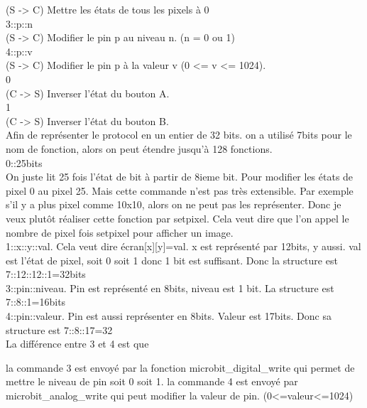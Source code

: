 \documentclass[14px]{article}
\begin{document}
(S -> C) Mettre les états de tous les pixels à 0
~\\

3::p::n
~\\

(S -> C) Modifier le pin p au niveau n. (n = 0 ou 1)
~\\

4::p::v
~\\

(S -> C) Modifier le pin p à la valeur v (0 <= v <= 1024).
~\\

0
~\\

(C -> S) Inverser l'état du bouton A.
~\\

1
~\\

(C -> S) Inverser l'état du bouton B.
~\\

Afin de représenter le protocol en un entier de 32 bits. on a utilisé 7bits pour le nom de fonction, alors on peut étendre jusqu'à 128 fonctions.
~\\

0::25bits
~\\

On juste lit 25 fois l'état de bit à partir de 8ieme bit. Pour modifier les états de pixel 0 au pixel 25. Mais cette commande n'est pas très extensible. Par exemple s'il y a plus pixel comme 10x10, alors on ne peut pas les représenter. Donc je veux plutôt réaliser cette fonction par setpixel. Cela veut dire que l'on appel le nombre de pixel fois setpixel pour afficher un image.
~\\

1::x::y::val. Cela veut dire écran[x][y]=val.
 x est représenté par 12bits, y aussi.
val est l'état de pixel, soit 0 soit 1 donc 1 bit est suffisant.  Donc la structure est 7::12::12::1=32bits
~\\

3::pin::niveau. Pin est représenté en 8bits,  niveau est 1 bit. La structure est 7::8::1=16bits
~\\


4::pin::valeur. Pin est aussi représenter en 8bits. Valeur est 17bits. Donc sa structure est 7::8::17=32
~\\

La différence entre 3 et 4 est que

la commande 3 est envoyé par la fonction microbit\_digital\_write qui permet de mettre le niveau de pin soit 0 soit 1.
la commande 4 est envoyé par microbit\_analog\_write qui peut modifier la valeur de pin. (0<=valeur<=1024)
\end{document}
